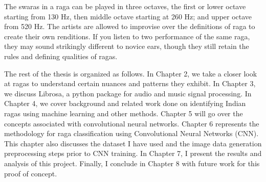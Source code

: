 The swaras in a raga can be played in three octaves, the first or lower octave starting from 130 Hz, then middle octave starting at 260 Hz; and upper octave from 520 Hz. The artists are allowed to improvise over the definitions of raga to create their own renditions. If you listen to two performance of the same raga, they may sound strikingly different to novice ears, though they still retain the rules and defining qualities of ragas. \par

The rest of the thesis is organized as follows. In Chapter 2, we take a closer look at ragas to understand certain nuances and patterns they exhibit. In Chapter 3, we discuss Librosa, a python package for audio and music signal processing. In Chapter 4, we cover background and related work done on identifying Indian ragas using machine learning and other methods. Chapter 5 will go over the concepts associated with convolutional neural networks. Chapter 6 represents the methodology for raga classification using Convolutional Neural Networks (CNN). This chapter also discusses the dataset I have used and the image data generation preprocessing steps prior to CNN training. In Chapter 7, I present the results and analysis of this project. Finally, I conclude in Chapter 8 with future work for this proof of concept.  
